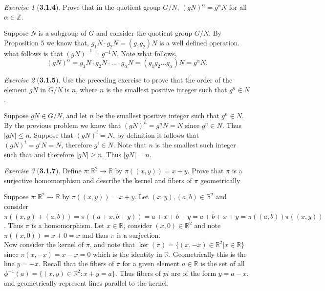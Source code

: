 \documentclass[12pt]{amsart}
\makeatletter
\theoremstyle{remark}
\newtheorem*{exercise}{Exercise}%
\def\RR{\ensuremath{\mathbb R}} %
\def\ZZ{\ensuremath{\mathbb Z}}
\renewenvironment{proof}[1][\proofname]{\par\doublespacing
  \pushQED{\qed}%
  \normalfont \topsep6\p@\@plus6\p@\relax
  \list{}{%
    \settowidth{\leftmargin}{\itshape\proofname:\hskip\labelsep}%
    \setlength{\labelwidth}{0pt}%
    \setlength{\itemindent}{-\leftmargin}%
  }%
  \item[\hskip\labelsep\itshape#1\@addpunct{:}]\ignorespaces
}{%
  \popQED\endlist\@endpefalse
  \singlespacing
}
\theoremstyle{mycomment}
\makeatother
\begin{document}
\begin{exercise}[\textbf{3.1.4}] Prove that in the quotient group $G/N$, $(gN)^\alpha = g^{\alpha}N$ for all 
  $\alpha \in \ZZ$.
    \begin{proof} Suppose $N$ is a subgroup of $G$ and consider the quotient group $G/N$. By Proposition 5 we know that, 
      $g_1N \cdot g_2N = (g_1g_2)N$ is a well defined operation. what follows is that $(gN)^{-1} = g^{-1}N$. Note what follows, 
      \begin{equation*}
        (gN)^\alpha = g_1N \cdot g_2N \cdot ... \cdot g_\alpha N = (g_1g_2...g_\alpha)N = g^{\alpha}N.
      \end{equation*}
    \end{proof}

\end{exercise}
\vspace{.15in}

\begin{exercise}[\textbf{3.1.5}] Use the preceding exercise to prove that the order of the element $gN$ in $G/N$
  is $n$, where $n$ is the smallest positive integer such that $g^n \in N$. 
    \begin{proof} Suppose $gN \in G/N$, and let $n$ be the smallest positive integer such that $g^n \in N$. By the previous 
      problem we know that $(gN)^n = g^nN = N$ since $g^n \in N$. Thus $|gN| \leq n$. Suppose that $(gN)^i = N$, by definition it follows 
      that $(gN)^i = g^iN = N$, therefore $g^i \in N$. Note that $n$ is the smallest such integer such that and therefore $|gN| \geq n$. 
      Thus $|gN| = n$.
    \end{proof}

\end{exercise}
\vspace{.15in}


\begin{exercise}[\textbf{3.1.7}]Define $\pi: \RR^2 \to \RR$ by $\pi((x, y)) = x+y$. Prove that $\pi$ is a surjective homomorphism 
  and describe the kernel and fibers of $\pi$ geometrically
    \begin{proof} Suppose $\pi: \RR^2 \to \RR$ by $\pi((x, y)) = x+y$. Let $(x, y), (a,b) \in \RR^2$ and consider $\pi((x, y) + (a, b)) = \pi((a + x, b + y)) = a + x + b + y = a + b + x + y = \pi((a, b))\pi((x, y))$. 
      Thus $\pi$ is a homomorphism. Let $x \in \RR$, consider $(x, 0) \in \RR^2$ and note $\pi((x, 0)) = x + 0 = x$ and thus $\pi$ is a surjection.\\
      Now consider the kernel of $\pi$, and note that $\ker(\pi) = \{(x, -x) \in \RR^2| x \in \RR\}$ since $\pi(x, -x) = x - x = 0$ which is the identity in $\RR$. 
      Geometrically this is the line $y = -x$. Recall that the fibers of $\pi$ for a given element $a \in \RR$ is the set of all 
      $\phi^{-1}(a) = \{(x, y) \in \RR^2: x + y = a\}$. Thus fibers of $pi$ are of the form $y = a - x$, and geometrically represent lines parallel to the kernel. 
    \end{proof}
\end{exercise}
\vspace{.15in}
\end{document}
